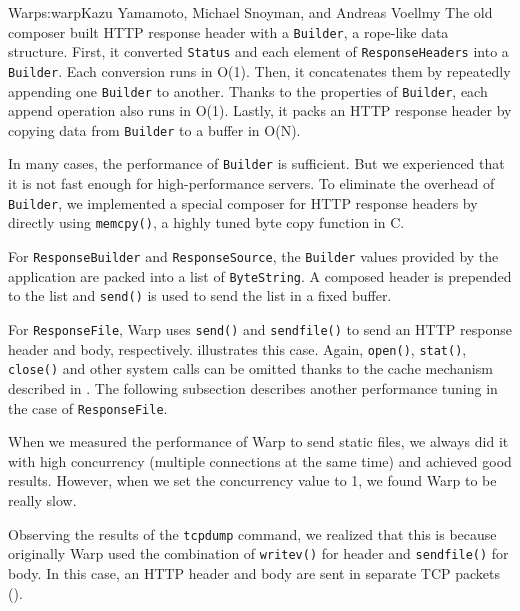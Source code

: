 \begin{aosachapter}{Warp}{s:warp}{Kazu Yamamoto, Michael Snoyman, and Andreas Voellmy}
The old composer built HTTP response header with a \texttt{Builder}, a
rope-like data structure. First, it converted \texttt{Status} and each
element of \texttt{ResponseHeaders} into a \texttt{Builder}. Each
conversion runs in O(1). Then, it concatenates them by repeatedly
appending one \texttt{Builder} to another. Thanks to the properties of
\texttt{Builder}, each append operation also runs in O(1). Lastly, it
packs an HTTP response header by copying data from \texttt{Builder} to a
buffer in O(N).

In many cases, the performance of \texttt{Builder} is sufficient. But we
experienced that it is not fast enough for high-performance servers. To
eliminate the overhead of \texttt{Builder}, we implemented a special
composer for HTTP response headers by directly using \texttt{memcpy()},
a highly tuned byte copy function in C.


For \texttt{ResponseBuilder} and \texttt{ResponseSource}, the
\texttt{Builder} values provided by the application are packed into a
list of \texttt{ByteString}. A composed header is prepended to the list
and \texttt{send()} is used to send the list in a fixed buffer.

For \texttt{ResponseFile}, Warp uses \texttt{send()} and
\texttt{sendfile()} to send an HTTP response header and body,
respectively.  illustrates this case. Again,
\texttt{open()}, \texttt{stat()}, \texttt{close()} and other system
calls can be omitted thanks to the cache mechanism described in
. The following subsection describes another
performance tuning in the case of \texttt{ResponseFile}.


When we measured the performance of Warp to send static files, we always
did it with high concurrency (multiple connections at the same time) and
achieved good results. However, when we set the concurrency value to 1,
we found Warp to be really slow.

Observing the results of the \texttt{tcpdump} command, we realized that
this is because originally Warp used the combination of
\texttt{writev()} for header and \texttt{sendfile()} for body. In this
case, an HTTP header and body are sent in separate TCP packets
().



\end{aosachapter}
